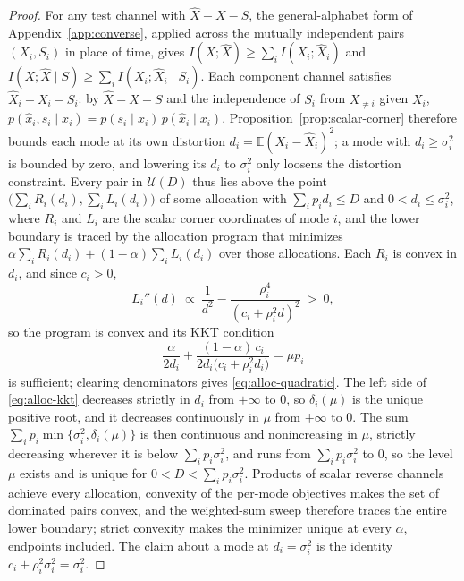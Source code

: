 \documentclass[letterpaper,onecolumn]{IEEEtran}
\theoremstyle{definition}
\theoremstyle{remark}
\newcommand{\E}{\mathbb{E}}
\newcommand{\hX}{\widehat{X}}
\newcommand{\1}{\mathbf{1}}
\begin{document}
\begin{proof}
For any test channel with $\hX-X-S$, the general-alphabet form of
Appendix~\ref{app:converse}, applied across the mutually independent pairs
$(X_i,S_i)$ in place of time, gives
$I(X;\hX)\ge\sum_iI(X_i;\hX_i)$ and
$I(X;\hX\mid S)\ge\sum_iI(X_i;\hX_i\mid S_i)$. Each component channel
satisfies $\hX_i-X_i-S_i$: by $\hX-X-S$ and the independence of $S_i$ from
$X_{\ne i}$ given $X_i$,
$p(\hat x_i,s_i\mid x_i)=p(s_i\mid x_i)\,p(\hat x_i\mid x_i)$.
Proposition~\ref{prop:scalar-corner} therefore bounds each mode at its
own distortion $d_i=\E(X_i-\hX_i)^2$; a mode with $d_i\ge\sigma_i^2$ is bounded
by zero, and lowering its $d_i$ to $\sigma_i^2$ only loosens the distortion
constraint. Every pair in $\mathcal U(D)$ thus lies above the point
$\bigl(\sum_iR_i(d_i),\sum_iL_i(d_i)\bigr)$ of some allocation with
$\sum_ip_id_i\le D$ and $0<d_i\le\sigma_i^2$, where $R_i$ and $L_i$ are the
scalar corner coordinates of mode $i$, and the lower boundary is traced by
the allocation program that minimizes
$\alpha\sum_iR_i(d_i)+(1-\alpha)\sum_iL_i(d_i)$ over those allocations. Each
$R_i$ is convex in $d_i$, and since $c_i>0$,
\begin{equation*}
 L_i''(d)\ \propto\ \frac1{d^2}-\frac{\rho_i^4}{(c_i+\rho_i^2d)^2}\ >\ 0,
\end{equation*}
so the program is convex and its KKT condition
\begin{equation}
 \frac{\alpha}{2d_i}
 +\frac{(1-\alpha)\,c_i}{2d_i\bigl(c_i+\rho_i^2d_i\bigr)}
 =\mu p_i
 \label{eq:alloc-kkt}
\end{equation}
is sufficient; clearing denominators gives \eqref{eq:alloc-quadratic}. The
left side of \eqref{eq:alloc-kkt} decreases strictly in $d_i$ from $+\infty$
to $0$, so $\delta_i(\mu)$ is the unique positive root, and it decreases
continuously in $\mu$ from $+\infty$ to $0$. The sum
$\sum_ip_i\min\{\sigma_i^2,\delta_i(\mu)\}$ is then continuous and
nonincreasing in $\mu$, strictly decreasing wherever it is below
$\sum_ip_i\sigma_i^2$, and runs from $\sum_ip_i\sigma_i^2$ to $0$, so the
level $\mu$ exists and is unique for $0<D<\sum_ip_i\sigma_i^2$.
Products of scalar reverse channels achieve every allocation, convexity of
the per-mode objectives makes the set of dominated pairs convex, and the
weighted-sum sweep therefore traces the entire lower boundary; strict
convexity makes the minimizer unique at every $\alpha$, endpoints included.
The claim about a mode at $d_i=\sigma_i^2$ is the identity
$c_i+\rho_i^2\sigma_i^2=\sigma_i^2$.


\end{proof}
\end{document}
